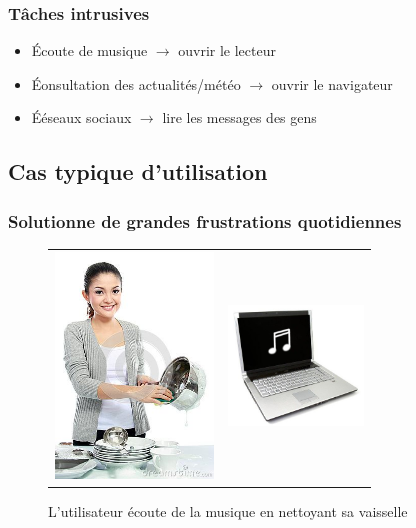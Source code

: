 \documentclass{beamer}
\begin{document}
\begin{frame}
\frametitle{Tâches intrusives}
\begin{itemize}
    \item Écoute de musique $\rightarrow$ ouvrir le lecteur
    \item Éonsultation des actualités/météo $\rightarrow$ ouvrir le navigateur
    \item Ééseaux sociaux $\rightarrow$ lire les messages des gens
\end{itemize}
\end{frame}

\subsection{Cas typique d'utilisation}
\begin{frame}
\frametitle{Solutionne de grandes frustrations quotidiennes}
\begin{figure}
    \caption{L'utilisateur écoute de la musique en nettoyant sa vaisselle}
    \begin{tabular}{cc}
    \includegraphics[height=6cm]{mains_mouillees} & \includegraphics[height=3.2cm]{laptop_music}
    \end{tabular}
\end{figure}
\end{frame}
\end{document}
